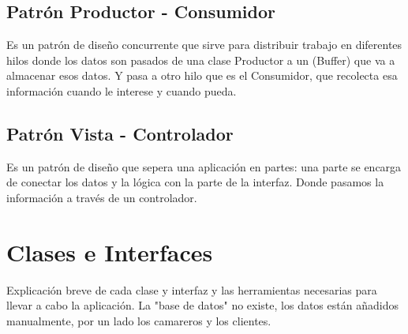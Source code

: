 \documentclass[a4paper,12pt]{article}
\begin{document}
\subsection{Patrón Productor - Consumidor}

Es un patrón de diseño concurrente que sirve para distribuir trabajo en diferentes hilos donde los datos son pasados 
de una clase Productor a un (Buffer) que va a almacenar esos datos. Y pasa a otro hilo que es el Consumidor, que recolecta
esa información cuando le interese y cuando pueda.

\subsection{Patrón Vista - Controlador}

Es un patrón de diseño que sepera una aplicación en partes: una parte se encarga de conectar los datos y la lógica con la parte de la interfaz. Donde pasamos la información a través de un controlador.


\vspace{1cm}
\section{Clases e Interfaces}
Explicación breve de cada clase y interfaz y las herramientas necesarias para llevar a cabo la aplicación. La "base de datos" no existe, los datos están añadidos manualmente, por un lado los camareros y los clientes.
\end{document}
